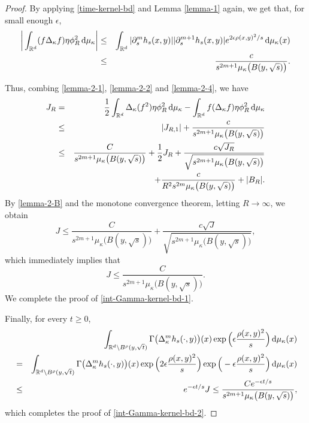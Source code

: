 \documentclass[11pt,a4paper]{article}
\def\R{\mathbb{R}}
\def\d{\textup{d}}
\theoremstyle{definition}\newtheorem{remark}[theorem]{Remark}
\begin{document}
\begin{proof}
By applying \eqref{time-kernel-bd} and Lemma \ref{lemma-1} again, we get that, for small enough $\epsilon$,
\begin{eqnarray}\label{lemma-2-4}
\bigg|\int_{\R^d}(f\Delta_\kappa f )\eta\phi_R^2\,\d\mu_\kappa\bigg|
&\leq&\int_{\R^d}|\partial_s^m h_s(x,y)||\partial_s^{m+1} h_s(x,y)|e^{2\epsilon\rho(x,y)^2/s}\,\d\mu_\kappa(x)\cr
&\leq&\frac{c}{s^{2m+1}\mu_\kappa\big(B(y,\sqrt{s})\big)}.
\end{eqnarray}

Thus, combing \eqref{lemma-2-1}, \eqref{lemma-2-2} and \eqref{lemma-2-4}, we have
\begin{eqnarray*}\label{lemma-2-5}
J_R&=&\frac{1}{2}\int_{\R^d}\Delta_\kappa(f^2)\eta\phi_R^2\,\d\mu_\kappa-\int_{\R^d}f(\Delta_\kappa f)\eta\phi_R^2\,\d\mu_\kappa\\
&\leq&|J_{R,1}|+\frac{c}{s^{2m+1}\mu_\kappa\big(B(y,\sqrt{s})\big)}\\
&\leq&\frac{C}{s^{2m+1}\mu_\kappa\big(B(y,\sqrt{s})\big)}+\frac{1}{2}J_R+\frac{c \sqrt{J_R}}{\sqrt{s^{2m+1}\mu_\kappa\big(B(y,\sqrt{s})\big)}}\\
&&+\frac{c}{R^2 s^{2m}\mu_\kappa\big(B(y,\sqrt{s})\big)}+|B_R|.
\end{eqnarray*}
By \eqref{lemma-2-B} and the monotone convergence theorem, letting $R\rightarrow\infty$,  we obtain
$$J\leq \frac{C}{s^{2m+1}\mu_\kappa\big(B(y,\sqrt{s})\big)}+\frac{c \sqrt{J}}{\sqrt{s^{2m+1}\mu_\kappa\big(B(y,\sqrt{s})\big)}},$$
which immediately implies that
$$J\leq\frac{C}{s^{2m+1}\mu_\kappa\big(B(y,\sqrt{s})\big)}.$$
We complete the proof of \eqref{int-Gamma-kernel-bd-1}.

Finally, for every $t\geq0$,
\begin{eqnarray*}
&&\int_{\R^d\setminus B^\rho(y,\sqrt{t})}\Gamma\big(\Delta_{\kappa}^mh_s(\cdot,y)\big)(x)
\exp\Big(\epsilon\frac{\rho(x,y)^2}{s}\Big)\,\d\mu_\kappa(x)\\
&=&\int_{\R^d\setminus B^\rho(y,\sqrt{t})}\Gamma\big(\Delta_{\kappa}^mh_s(\cdot,y)\big)(x)\exp\Big(2\epsilon\frac{\rho(x,y)^2}{s}\Big)
\exp\Big(-\epsilon\frac{\rho(x,y)^2}{s}\Big)\,\d\mu_\kappa(x)\\
&\leq&e^{-\epsilon t/s}J\leq\frac{Ce^{-\epsilon t/s}}{s^{2m+1}\mu_\kappa\big(B(y,\sqrt{s})\big)},
\end{eqnarray*}
which completes the proof of \eqref{int-Gamma-kernel-bd-2}.
\end{proof}
\end{document}
